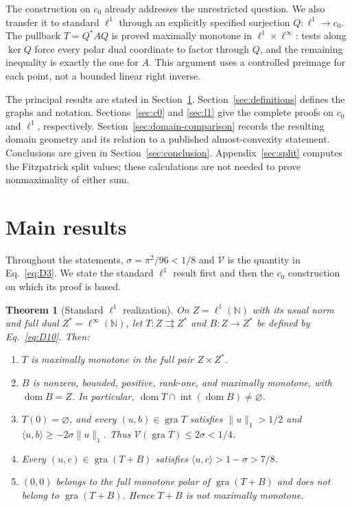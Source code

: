 \documentclass[11pt]{article}
\newcommand{\N}{\mathbb N}
\newcommand{\gra}{\operatorname{gra}}
\newcommand{\dom}{\operatorname{dom}}
\newcommand{\pair}[2]{\langle #1,#2\rangle}
\newtheorem{theorem}{Theorem}
\begin{document}
The construction on $c_0$ already addresses the unrestricted question.
We also transfer it to standard $\ell^1$ through an explicitly specified
surjection $Q:\ell^1\to c_0$. The pullback $T=Q^*AQ$ is proved maximally
monotone in $\ell^1\times\ell^\infty$: tests along $\ker Q$ force every
polar dual coordinate to factor through $Q$, and the remaining inequality
is exactly the one for $A$. This argument uses a controlled preimage for
each point, not a bounded linear right inverse.

The principal results are stated in Section~\ref{sec:statements}.
Section~\ref{sec:definitions} defines the graphs and notation.
Sections~\ref{sec:c0} and \ref{sec:l1} give the complete proofs on $c_0$
and $\ell^1$, respectively. Section~\ref{sec:domain-comparison} records
the resulting domain geometry and its relation to a published
almost-convexity statement. Conclusions are given in
Section~\ref{sec:conclusion}. Appendix~\ref{sec:split} computes the
Fitzpatrick split values; these calculations are not needed to prove
nonmaximality of either sum.

\section{Main results}
\label{sec:statements}
Throughout the statements, $\sigma=\pi^2/96<1/8$ and $\mathcal V$ is
the quantity in Eq.~\eqref{eq:D3}. We state the standard $\ell^1$ result
first and then the $c_0$ construction on which its proof is based.
\renewcommand{\thetheorem}{L}
\begin{theorem}[Standard $\ell^1$ realization]\label{thm:L}
On $Z=\ell^1(\N)$ with its usual norm and full dual $Z^*=\ell^\infty(\N)$,
let $T:Z\rightrightarrows Z^*$ and $B:Z\to Z^*$ be defined by Eq.~\eqref{eq:D10}.
Then:
\begin{enumerate}
\item $T$ is maximally monotone in the full pair $Z\times Z^*$.
\item $B$ is nonzero, bounded, positive, rank-one, and maximally monotone,
with $\dom B=Z$. In particular,
$\dom T\cap\operatorname{int}(\dom B)\ne\varnothing$.
\item $T(0)=\varnothing$, and every $(u,b)\in\gra T$ satisfies
$\|u\|_1>1/2$ and $\pair{u}{b}\ge-2\sigma\|u\|_1$.
Thus $\mathcal V(\gra T)\le2\sigma<1/4$.
\item Every $(u,c)\in\gra(T+B)$ satisfies
$\pair{u}{c}>1-\sigma>7/8$.
\item $(0,0)$ belongs to the full monotone polar of $\gra(T+B)$ and does
not belong to $\gra(T+B)$. Hence $T+B$ is not maximally monotone.
\end{enumerate}
\end{theorem}
\end{document}
